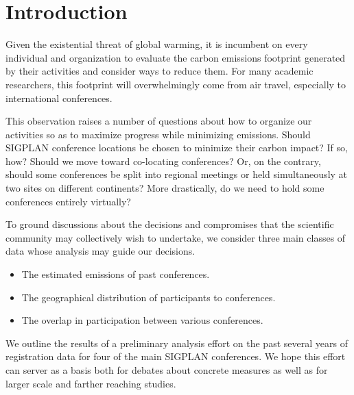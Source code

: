 \section{Introduction}

Given the existential threat of global warming, it is incumbent on every
individual and organization to evaluate the carbon emissions footprint
generated by their activities and consider ways to reduce them.  For many
academic researchers, this footprint will overwhelmingly come from air
travel, especially to international conferences.

This observation raises a number of questions about how to organize our
activities so as to maximize progress while minimizing emissions.  Should
SIGPLAN conference locations be chosen to minimize their carbon impact? If
so, how? Should we move toward co-locating conferences? Or, on the contrary,
should some conferences be split into regional meetings or held
simultaneously at two sites on different continents?  More drastically,
do we need to hold some conferences entirely virtually?

To ground discussions about the decisions and compromises that the
scientific community may collectively wish to undertake, we consider three
main classes of data whose analysis may guide our decisions.
\begin{itemize}
\item The estimated emissions of past conferences.
\item The geographical distribution of participants to conferences.
\item The overlap in participation between various conferences.
\end{itemize}

We outline the results of a preliminary analysis effort on the past several
years of registration data for four of the main SIGPLAN conferences.  We
hope this effort can server as a basis both for debates about concrete
measures as well as for larger scale and farther reaching studies.  


